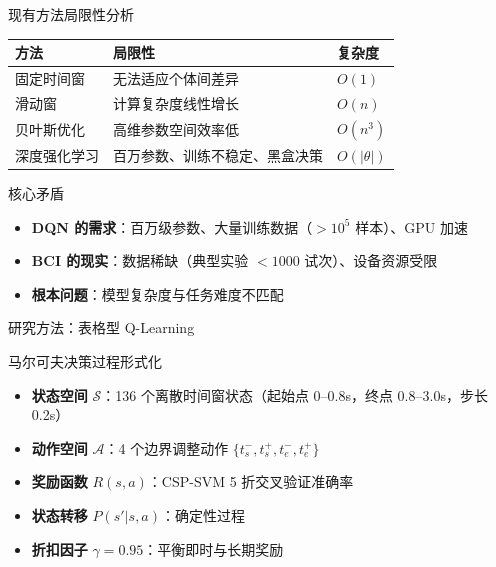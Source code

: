{\begin{frame}{现有方法局限性分析}
    \begin{table}[h]
        \centering
        \renewcommand{\arraystretch}{1.3}
        \begin{tabular}{l|l|l}
            \hline
            \textbf{方法} & \textbf{局限性} & \textbf{复杂度} \\
            \hline
            固定时间窗 & 无法适应个体间差异 & $O(1)$ \\
            滑动窗 & 计算复杂度线性增长 & $O(n)$ \\
            贝叶斯优化 & 高维参数空间效率低 & $O(n^3)$ \\
            深度强化学习 & 百万参数、训练不稳定、黑盒决策 & $O(|\theta|)$ \\
            \hline
        \end{tabular}
    \end{table}

    \vspace{0.3cm}
    \begin{block}{核心矛盾}
        \begin{itemize}
            \item \textbf{DQN 的需求}：百万级参数、大量训练数据（$>10^5$ 样本）、GPU 加速
            \item \textbf{BCI 的现实}：数据稀缺（典型实验 $<1000$ 试次）、设备资源受限
            \item \textbf{根本问题}：模型复杂度与任务难度不匹配
        \end{itemize}
    \end{block}
\end{frame}

\begin{frame}{研究方法：表格型 Q-Learning}
    \begin{block}{马尔可夫决策过程形式化}
        \begin{itemize}
            \item \textbf{状态空间} $\mathcal{S}$：136 个离散时间窗状态（起始点 0--0.8s，终点 0.8--3.0s，步长 0.2s）
            \item \textbf{动作空间} $\mathcal{A}$：4 个边界调整动作 $\{t_s^-, t_s^+, t_e^-, t_e^+\}$
            \item \textbf{奖励函数} $R(s,a)$：CSP-SVM 5 折交叉验证准确率
            \item \textbf{状态转移} $P(s'|s,a)$：确定性过程
            \item \textbf{折扣因子} $\gamma = 0.95$：平衡即时与长期奖励
        \end{itemize}
    \end{block}


\end{frame}}
